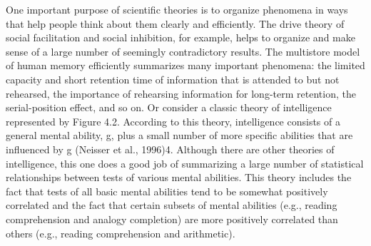 One important purpose of scientific theories is to organize phenomena in ways that help people think about them clearly and efficiently. The drive theory of social facilitation and social inhibition, for example, helps to organize and make sense of a large number of seemingly contradictory results. The multistore model of human memory efficiently summarizes many important phenomena: the limited capacity and short retention time of information that is attended to but not rehearsed, the importance of rehearsing information for long-term retention, the serial-position effect, and so on. Or consider a classic theory of intelligence represented by Figure 4.2. According to this theory, intelligence consists of a general mental ability, g, plus a small number of more specific abilities that are influenced by g (Neisser et al., 1996)4. Although there are other theories of intelligence, this one does a good job of summarizing a large number of statistical relationships between tests of various mental abilities. This theory includes the fact that tests of all basic mental abilities tend to be somewhat positively correlated and the fact that certain subsets of mental abilities (e.g., reading comprehension and analogy completion) are more positively correlated than others (e.g., reading comprehension and arithmetic).


